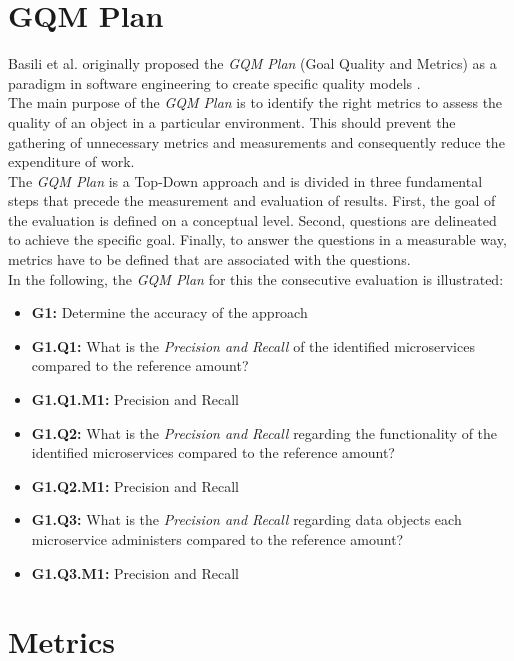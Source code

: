 \section{GQM Plan}
\label{sec:Evaluation:GQM}
Basili et al. originally proposed the \textit{GQM Plan} (Goal Quality and Metrics) as a paradigm in software engineering to create specific quality models \cite{BasiliGQM}. \\
The main purpose of the \textit{GQM Plan} is to identify the right metrics to assess the quality of an object in a particular environment. This should prevent the gathering of unnecessary metrics and measurements and consequently reduce the expenditure of work. \\
The \textit{GQM Plan} is a Top-Down approach and is divided in three fundamental steps that precede the measurement and evaluation of results. First, the goal of the evaluation is defined on a conceptual level. Second, questions are delineated to achieve the specific goal. Finally, to answer the questions in a measurable way, metrics have to be defined that are associated with the questions. \\
In the following, the \textit{GQM Plan} for this the consecutive evaluation is illustrated:

\begin{itemize}
	\item \textbf{G1:} Determine the accuracy of the approach
	\item \textbf{G1.Q1:} What is the \textit{Precision and Recall} of the identified microservices compared to the reference amount?
	\item \textbf{G1.Q1.M1:}  Precision and Recall
	\item \textbf{G1.Q2:} What is the \textit{Precision and Recall} regarding the functionality of the identified microservices compared to the reference amount?
	\item \textbf{G1.Q2.M1:}  Precision and Recall
		\item \textbf{G1.Q3:} What is the \textit{Precision and Recall} regarding data objects each microservice administers compared to the reference amount?
	\item \textbf{G1.Q3.M1:}  Precision and Recall

\end{itemize}




\section{Metrics}
\label{sec:Evaluation:Metrics}

